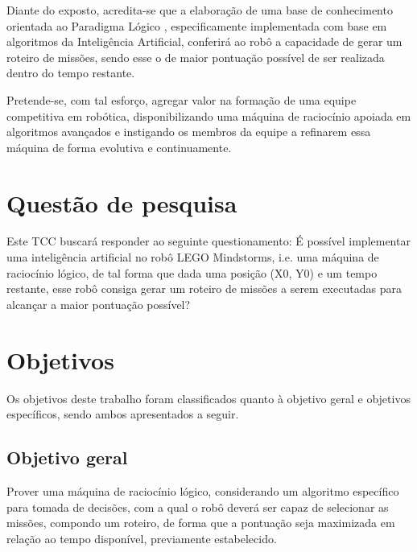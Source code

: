 Diante do exposto, acredita-se que a elaboração de uma base de conhecimento orientada ao Paradigma Lógico \cite[chap. 15]{tucker2009linguagens}, especificamente implementada com base em algoritmos da Inteligência Artificial, conferirá ao robô a capacidade de gerar um roteiro de missões, sendo esse o de maior pontuação possível de ser realizada dentro do tempo restante.

Pretende-se, com tal esforço, agregar valor na formação de uma equipe competitiva em robótica, disponibilizando uma máquina de raciocínio apoiada em algoritmos avançados e instigando os membros da equipe a refinarem essa máquina de forma evolutiva e continuamente.

\section{Questão de pesquisa}

Este TCC buscará responder ao seguinte questionamento: É possível implementar uma inteligência artificial no robô LEGO Mindstorms, i.e. uma máquina de raciocínio lógico, de tal forma que dada uma posição (X0, Y0) e um tempo restante, esse robô consiga gerar um roteiro de missões a serem executadas para alcançar a maior pontuação possível?

\section{Objetivos}
Os objetivos deste trabalho foram classificados quanto à objetivo geral e objetivos específicos, sendo ambos apresentados a seguir.

\subsection{Objetivo geral}
Prover uma máquina de raciocínio lógico, considerando um algoritmo específico para tomada de decisões, com a qual o robô deverá ser capaz de selecionar as missões, compondo um roteiro, de forma que a pontuação seja maximizada em relação ao tempo disponível, previamente estabelecido.

